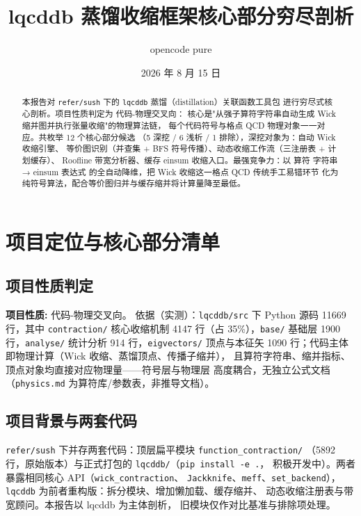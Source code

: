 \documentclass[UTF8]{ctexart}
\title{lqcddb 蒸馏收缩框架核心部分穷尽剖析}
\author{opencode pure}
\date{2026 年 8 月 15 日}
\begin{document}
\maketitle

\begin{abstract}
本报告对 \texttt{refer/sush} 下的 \texttt{lqcddb} 蒸馏（distillation）关联函数工具包
进行穷尽式核心剖析。项目性质判定为 \textcolor{phys}{代码-物理交叉向}：
核心是"从强子算符字符串自动生成 Wick 缩并图并执行张量收缩"的物理算法链，
每个代码符号与格点 QCD 物理对象一一对应。共枚举 12 个核心部分候选
（\textcolor{algo}{5 深挖 / 6 浅析 / 1 排除}），深挖对象为：自动 Wick 收缩引擎、
等价图识别（并查集 + BFS 符号传播）、动态收缩工作流（三注册表 + 计划缓存）、
Roofline 带宽分析器、缓存 einsum 收缩入口。最强竞争力：以 \textcolor{map}{算符
字符串 → einsum 表达式} 的全自动降维，把 Wick 收缩这一格点 QCD 传统手工易错环节
化为纯符号算法，配合等价图归并与缓存缩并将计算量降至最低。
\end{abstract}

\tableofcontents

\section{项目定位与核心部分清单}

\subsection{项目性质判定}

\begin{keybox}
\textbf{项目性质:} \textcolor{phys}{代码-物理交叉向}。
依据（实测）：\texttt{lqcddb/src} 下 Python 源码 11669 行，其中
\texttt{contraction/} 核心收缩机制 4147 行（占 35\%），\texttt{base/} 基础层
1900 行，\texttt{analyse/} 统计分析 914 行，\texttt{eigvectors/} 顶点与本征矢
1090 行；代码主体即物理计算（Wick 收缩、蒸馏顶点、传播子缩并），
且算符字符串、缩并指标、顶点对象均直接对应物理量——符号层与物理层
高度耦合，无独立公式文档（\texttt{physics.md} 为算符库/参数表，非推导文档）。
\end{keybox}

\subsection{项目背景与两套代码}

\texttt{refer/sush} 下并存两套代码：顶层扁平模块 \texttt{function\_contraction/}
（5892 行，原始版本）与正式打包的 \texttt{lqcddb/}（\texttt{pip install -e .}，
积极开发中）。两者暴露相同核心 API（\texttt{wick\_contraction}、
\texttt{Jackknife}、\texttt{meff}、\texttt{set\_backend}），
\texttt{lqcddb} 为前者重构版：拆分模块、增加懒加载、缓存缩并、
动态收缩注册表与带宽顾问。本报告以 \textcolor{phys}{lqcddb} 为主体剖析，
\color{accent} 旧模块仅作对比基准与排除项处理。
\end{document}
